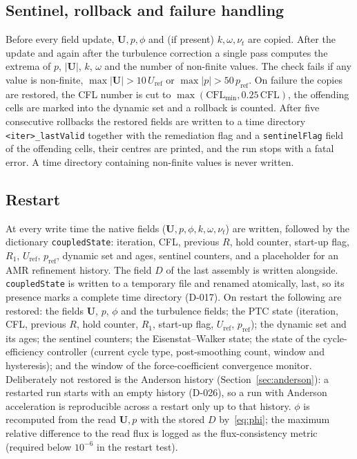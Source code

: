 \documentclass[11pt,a4paper]{article}
\newcommand{\vect}[1]{\mathbf{#1}}
\newcommand{\Uv}{\vect{U}}
\newcommand{\code}[1]{\texttt{#1}}
\begin{document}
\subsection{Sentinel, rollback and failure handling}\label{sec:sentinel}

Before every field update, $\Uv,p,\phi$ and (if present) $k,\omega,\nu_t$ are
copied. After the update and again after the turbulence correction a single
pass computes the extrema of $p$, $|\Uv|$, $k$, $\omega$ and the number of
non-finite values. The check fails if any value is non-finite,
$\max|\Uv|>10\,U_{\mathrm{ref}}$ or $\max|p|>50\,p_{\mathrm{ref}}$. On failure the
copies are restored, the CFL number is cut to
$\max(\mathrm{CFL}_{\min},0.25\,\mathrm{CFL})$, the offending cells are marked
into the dynamic set and a rollback is counted. After five consecutive
rollbacks the restored fields are written to a time directory
\code{<iter>\_lastValid} together with the remediation flag and a
\code{sentinelFlag} field of the offending cells, their centres are printed,
and the run stops with a fatal error. A time directory containing
non-finite values is never written.

\subsection{Restart}\label{sec:restart}

At every write time the native fields ($\Uv,p,\phi,k,\omega,\nu_t$) are written,
followed by the dictionary \code{coupledState}: iteration, CFL, previous
$R$, hold counter, start-up flag, $R_1$, $U_{\mathrm{ref}}$, $p_{\mathrm{ref}}$,
dynamic set and ages, sentinel counters, and a placeholder for an AMR
refinement history. The field $D$ of the last assembly is written alongside.
\code{coupledState} is written to a temporary file and renamed atomically,
last, so its presence marks a complete time directory (D-017). On restart
the following are restored: the fields $\Uv$, $p$, $\phi$ and the turbulence
fields; the PTC state (iteration, CFL, previous $R$, hold counter, $R_1$,
start-up flag, $U_{\mathrm{ref}}$, $p_{\mathrm{ref}}$); the dynamic set and
its ages; the sentinel counters; the Eisenstat--Walker state; the state of
the cycle-efficiency controller (current cycle type, post-smoothing count,
window and hysteresis); and the window of the force-coefficient convergence
monitor. Deliberately not restored is the Anderson history
(Section~\ref{sec:anderson}): a restarted run starts with an empty history
(D-026), so a run with Anderson acceleration is reproducible across a
restart only up to that history. $\phi$ is recomputed from the read $\Uv,p$
with the stored $D$ by~\eqref{eq:phi}; the maximum relative difference to
the read flux is logged as the flux-consistency metric (required below
$10^{-6}$ in the restart test).
\end{document}
